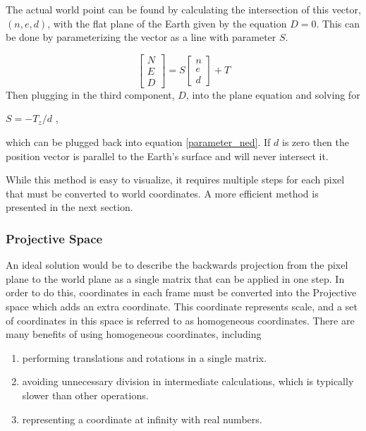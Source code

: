  The actual world point can be found by calculating the intersection of this vector, $(n,e,d)$, with the flat plane of the Earth given by the equation $D=0$.  This can be done by parameterizing the vector as a line with parameter $S$.
 
 \begin{equation}
 \label{parameter_ned}
 \begin{bmatrix} N \\ E \\ D \end{bmatrix} =
 S \begin{bmatrix} n \\ e \\ d \end{bmatrix}
 + T
 \end{equation}
 Then plugging in the third component, $D$, into the plane equation and solving for
 \begin{center}
 $S = -T_z / d$
 , 
 \end{center}
 which can be plugged back into equation \ref{parameter_ned}.  If $d$ is zero then the position vector is parallel to the Earth's surface and will never intersect it.   

 While this method is easy to visualize, it requires multiple steps for each pixel that must be converted to world coordinates.  A more efficient method is presented in the next section.

 \subsubsection{Projective Space}
 \label{section:projection_space}
 
 An ideal solution would be to describe the backwards projection from the pixel plane to the world plane as a single matrix that can be applied in one step.  In order to do this, coordinates in each frame must be converted into the Projective space which adds an extra coordinate.  This coordinate represents scale, and a set of coordinates in this space is referred to as homogeneous coordinates.  There are many benefits of using homogeneous coordinates, including
 \begin{enumerate}
 \item performing translations and rotations in a single matrix.
 \item avoiding unnecessary division in intermediate calculations, which is typically slower than other operations.
 \item representing a coordinate at infinity with real numbers.
 \end{enumerate}
 
